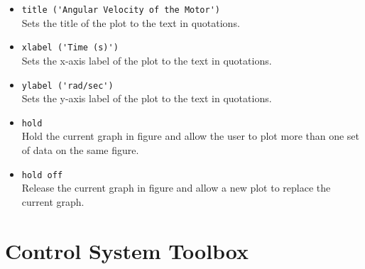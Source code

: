 \begin{itemize}
\item \verb|title ('Angular Velocity of the Motor')|\\
Sets the title of the plot to the text in quotations.

\item \verb|xlabel ('Time (s)')|\\
Sets the x-axis label of the plot to the text in quotations.

\item \verb|ylabel ('rad/sec')|\\
Sets the y-axis label of the plot to the text in quotations.

\item \verb|hold|\\
Hold the current graph in figure and allow the user to plot more than one set
of data on the same figure.

\item \verb|hold off|\\
Release the current graph in figure and allow a new plot to replace the
current graph.
\end{itemize}

\section{Control System Toolbox}

